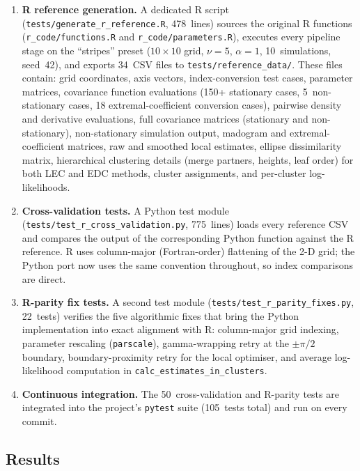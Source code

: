 \documentclass[a4paper]{elsarticle}
\begin{document}
\begin{enumerate}
\item \textbf{R reference generation.}
  A dedicated R script (\texttt{tests/generate\_r\_reference.R},
  478~lines) sources the original R functions
  (\texttt{r\_code/functions.R} and \texttt{r\_code/parameters.R}),
  executes every pipeline stage on the ``stripes'' preset
  ($10 \times 10$ grid, $\nu = 5$, $\alpha = 1$, 10~simulations,
  seed~42), and exports 34~CSV files to
  \texttt{tests/reference\_data/}.
  These files contain: grid coordinates, axis vectors,
  index-conversion test cases, parameter matrices,
  covariance function evaluations (150+ stationary cases,
  5~non-stationary cases, 18 extremal-coefficient conversion cases),
  pairwise density and derivative evaluations,
  full covariance matrices (stationary and non-stationary),
  non-stationary simulation output,
  madogram and extremal-coefficient matrices,
  raw and smoothed local estimates,
  ellipse dissimilarity matrix,
  hierarchical clustering details (merge partners, heights, leaf order)
  for both LEC and EDC methods,
  cluster assignments, and per-cluster log-likelihoods.

\item \textbf{Cross-validation tests.}
  A Python test module (\texttt{tests/test\_r\_cross\_validation.py},
  775~lines) loads every reference CSV and compares the output of the
  corresponding Python function against the R reference.
  R uses column-major (Fortran-order) flattening of the 2-D grid;
  the Python port now uses the same convention throughout,
  so index comparisons are direct.

\item \textbf{R-parity fix tests.}
  A second test module (\texttt{tests/test\_r\_parity\_fixes.py},
  22~tests) verifies the five algorithmic fixes that bring the
  Python implementation into exact alignment with R:
  column-major grid indexing, parameter rescaling (\texttt{parscale}),
  gamma-wrapping retry at the $\pm\pi/2$ boundary,
  boundary-proximity retry for the local optimiser,
  and average log-likelihood computation in
  \texttt{calc\_estimates\_in\_clusters}.

\item \textbf{Continuous integration.}
  The 50~cross-validation and R-parity tests are integrated into
  the project's \texttt{pytest} suite (105~tests total) and run on
  every commit.
\end{enumerate}

\subsection{Results}
\end{document}
